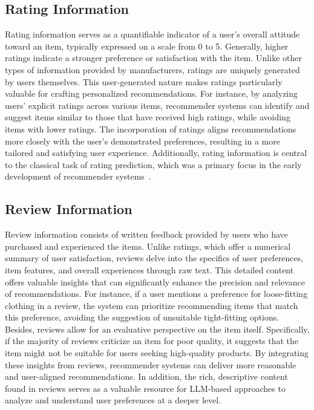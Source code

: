 \documentclass[lettersize,journal]{IEEEtran}
\begin{document}
\subsection{Rating Information}
{Rating} information serves as a quantifiable indicator of a user's overall attitude toward an item, typically expressed on a scale from 0 to 5. Generally, higher ratings indicate a stronger preference or satisfaction with the item. Unlike other types of information provided by manufacturers, ratings are uniquely generated by users themselves. This user-generated nature makes ratings particularly valuable for crafting personalized recommendations. For instance, by analyzing users' explicit ratings across various items, recommender systems can identify and suggest items similar to those that have received high ratings, while avoiding items with lower ratings. The incorporation of ratings aligns recommendations more closely with the user's demonstrated preferences, resulting in a more tailored and satisfying user experience. Additionally, rating information is central to the classical task of rating prediction, which was a primary focus in the early development of recommender systems~\cite{Tang@RecSys2013,Wang@IJCAI2016}.


\subsection{Review Information}
Review information consists of written feedback provided by users who have purchased and experienced the items. Unlike ratings, which offer a numerical summary of user satisfaction, reviews delve into the specifics of user preferences, item features, and overall experiences through raw text. This detailed content offers valuable insights that can significantly enhance the precision and relevance of recommendations. For instance, if a user mentions a preference for loose-fitting clothing in a review, the system can prioritize recommending items that match this preference, avoiding the suggestion of unsuitable tight-fitting options. Besides, reviews allow for an evaluative perspective on the item itself. Specifically, if the majority of reviews criticize an item for poor quality, it suggests that the item might not be suitable for users seeking high-quality products. By integrating these insights from reviews, recommender systems can deliver more reasonable and user-aligned recommendations. In addition, the rich, descriptive content found in reviews serves as a valuable resource for LLM-based approaches to analyze and understand user preferences at a deeper level.
\end{document}
